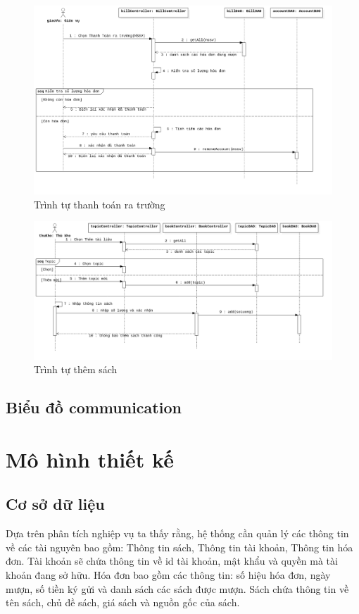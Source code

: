 \begin{figure}[H]
\centering
\includegraphics[width=\textwidth]{figures/thanhtoanratruongseq.png}
\caption{Trình tự thanh toán ra trường}
\end{figure}

\begin{figure}[H]
\centering
\includegraphics[width=\textwidth]{figures/themTlseq.png}
\caption{Trình tự thêm sách}
\end{figure}

\subsection{Biểu đồ communication}

\section{Mô hình thiết kế}
\subsection{Cơ sở dữ liệu}
Dựa trên phân tích nghiệp vụ ta thấy rằng, hệ thống cần quản lý các thông 
tin về các tài nguyên bao gồm: Thông tin sách, Thông tin tài khoản, 
Thông tin hóa đơn.
Tài khoản sẽ chứa thông tin về id tài khoản, mật khẩu và quyền mà 
tài khoản đang sở hữu.
Hóa đơn bao gồm các thông tin: số hiệu hóa đơn, ngày mượn, 
số tiền ký gửi và danh sách các sách được mượn.
Sách chứa thông tin về tên sách, chủ đề sách, 
giá sách và nguồn gốc của sách. 

